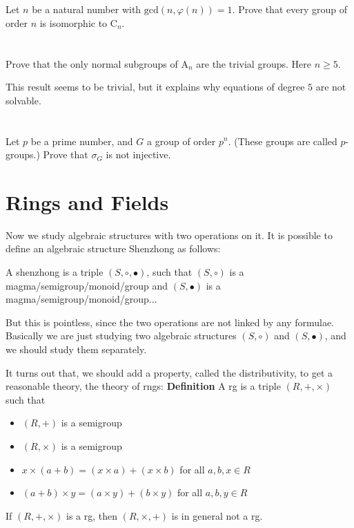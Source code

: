 \documentclass{report}
\begin{document}
\section{}
Let $n$ be a natural number with $\text{gcd}(n,\varphi(n)) = 1$. Prove that every group of order $n$ is isomorphic to $\text{C}_n$.
\section{}
Prove that the only normal subgroups of $\text{A}_n$ are the trivial groups. Here $n \ge 5$.

This result seems to be trivial, but it explains why equations of degree $5$ are not solvable.
\section{}
Let $p$ be a prime number, and $G$ a group of order $p^n$. (These groups are called $p$-groups.) Prove that $\sigma_G$ is not injective.
\newpage
\section*{Rings and Fields}
Now we study algebraic structures with two operations on it. It is possible to define an algebraic structure Shenzhong as follows:

A shenzhong is a triple $(S,\circ,\bullet)$, such that $(S,\circ)$ is a magma/semigroup/monoid/group and $(S,\bullet)$ is a magma/semigroup/monoid/group...

But this is pointless, since the two operations are not linked by any formulae. Basically we are just studying two algebraic structures $(S,\circ)$ and $(S,\bullet)$, and we should study them separately.

It turns out that, we should add a property, called the distributivity, to get a reasonable theory, the theory of rngs:
\newline
\newline
\textbf{Definition} A rg is a triple $(R,+,\times)$ such that
\begin{itemize}
\item $(R,+)$ is a semigroup
\item $(R,\times)$ is a semigroup
\item $x\times(a+b)=(x\times a)+(x\times b)$ for all $a,b,x \in R$
\item $(a+b)\times y = (a\times y)+(b\times y)$ for all $a,b,y \in R$
\end{itemize}
If $(R,+,\times)$ is a rg, then $(R,\times,+)$ is in general not a rg.
\end{document}
